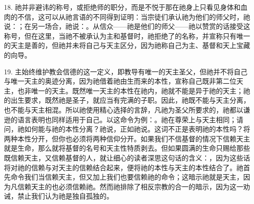 18. 祂并非避讳的称号，或拒绝师的职分，而是不悦于那在祂身上只看见身体和血肉的不信，这可以从祂言语的不同得到证明：当宗徒们承认祂为他们的师父时，祂说：；在另一场合，祂说：。从信众——祂是他们的师父——祂以赞赏的话接受这称号，但在这里，当祂不被承认为主和基督时，祂拒绝了的名称，并宣称只有唯一的天主是善的，但祂并未将自己与天主区分，因为祂称自己为主、基督和天上宝藏的向导。\par

19. 主始终维护教会信德的这一定义，即教导有唯一的天主圣父，但祂并不将自己与唯一天主的奥迹分离，因为祂借着祂由生而来的本性，宣称自己既非第二位天主，也非唯一的天主。既然唯一天主的本性在祂内，祂就不能是异于祂的天主；祂的出生要求，既然祂是圣子，就应当有完满的子职。因此，祂既不能与天主分离，也不能与天主相混。所以祂使用精心选择的言辞，凡祂为圣父所要求的，祂都以谦逊的语言表明也同样适用于自己。以这命令为例：。祂在尊荣上与天主相同；请问，祂如何能与祂的本性分离？祂说，正如祂说。这词不正是表明祂的本性吗？将两种本性分开，但你也必须将两种信仰分开。如果我们不信基督的情况下信赖天主就是生命，那么就将基督的名号和天主性特质剥去。但如果圆满的生命只赐给那些既信赖天主，又信赖基督的人，就让细心的读者深思这句话的含义：，因为这些话将对祂的信赖与对天主的信赖结合起来，便将祂的本性与天主的本性结合了。祂首先命令我们当信赖天主，但又加上我们也要信赖祂的命令；这暗示祂就是天主，因为凡信赖天主的也必须信赖祂。然而祂排除了相反宗教的合一的暗示，因为这一劝诫，禁止我们认为祂是独自孤独的。\par

